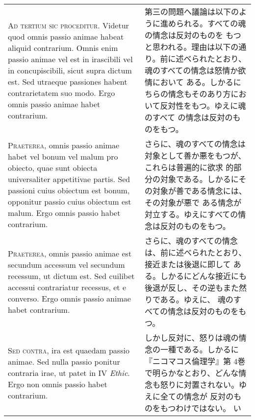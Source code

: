 \documentclass[10pt]{jsarticle} %
\begin{document}
\begin{longtable}{p{21em}p{21em}}



{\scshape Ad tertium sic proceditur}. Videtur quod omnis passio animae habeat
 aliquid contrarium. Omnis enim passio animae vel est in irascibili vel
 in concupiscibili, sicut supra dictum est. Sed utraeque passiones
 habent contrarietatem suo modo. Ergo omnis passio animae habet
 contrarium.

&

第三の問題へ議論は以下のように進められる。すべての魂の情念は反対のものを
 もつと思われる。理由は以下の通り。前に述べられたとおり、魂のすべての情念は怒情か欲情において
 ある。しかるにちらの情念もそのあり方において反対性をもつ。ゆえに魂のすべて
 の情念は反対のものをもつ。

\\



{\scshape Praeterea}, omnis passio animae habet vel bonum vel malum pro obiecto,
 quae sunt obiecta universaliter appetitivae partis. Sed passioni cuius
 obiectum est bonum, opponitur passio cuius obiectum est malum. Ergo
 omnis passio habet contrarium.

&

さらに、魂のすべての情念は対象として善か悪をもつが、これらは普遍的に欲求
 的部分の対象である。しかるにその対象が善である情念には、その対象が悪で
 ある情念が対立する。ゆえにすべての情念は反対のものをもつ。

\\


{\scshape Praeterea}, omnis passio animae est secundum accessum vel secundum
 recessum, ut dictum est. Sed cuilibet accessui contrariatur recessus,
 et e converso. Ergo omnis passio animae habet contrarium.

&

さらに、魂のすべての情念は、前に述べられたとおり、接近または後退に即して
 ある。しかるにどんな接近にも後退が反し、その逆もまた然りである。ゆえに、
 魂のすべての情念は反対のものをもつ。



\\



{\scshape Sed contra}, ira est quaedam passio animae. Sed nulla passio ponitur
 contraria irae, ut patet in IV {\itshape Ethic}. Ergo non omnis passio habet
 contrarium.

&

しかし反対に、怒りは魂の情念の一種である。しかるに『ニコマコス倫理学』第
 4巻で明らかなとおり、どんな情念も怒りに対置されない。ゆえに全ての情念が
 反対のものをもつわけではない。
 い


\end{longtable}
\end{document}
